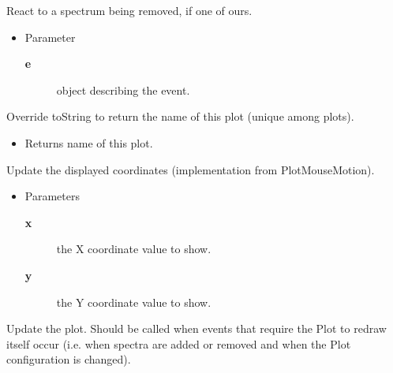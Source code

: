 \begin{desc}React to a spectrum being removed, if one of ours.
\begin{itemize}
\item{Parameter
  \begin{description}
   \item[\textbf{e}]{object describing the event.}
  \end{description}}
\end{itemize}
\end{desc}

\begin{desc}Override toString to return the name of this plot (unique
 among plots).
\begin{itemize}
\item{Returns name of this plot. }
\end{itemize}
\end{desc}

\begin{desc}Update the displayed coordinates (implementation from PlotMouseMotion).
\begin{itemize}
\item{Parameters
  \begin{description}
   \item[\textbf{x}]{the X coordinate value to show.}
   \item[\textbf{y}]{the Y coordinate value to show.}
  \end{description}}
\end{itemize}
\end{desc}

\begin{desc}Update the plot. Should be called when events that require the
 Plot to redraw itself occur (i.e. when spectra are added or
 removed and when the Plot configuration is changed).
\end{desc}

